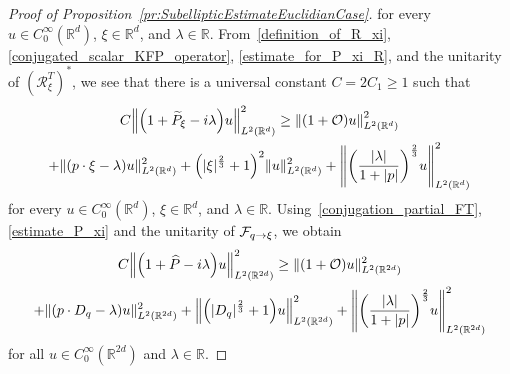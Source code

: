 \documentclass[AHL,Unicode,longabstracts]{cedram}
\newcommand{\R}{\mathbb{R}}
\newcommand{\clO}{\mathcal{O}}
\newcommand{\clR}{\mathcal{R}}
\newcommand{\clF}{\mathcal{F}}
\let\oldhat\hat
\renewcommand*{\hat}[1]{\mathchoice{\widehat{#1}}{\widehat{#1}}{\oldhat{#1}}{\oldhat{#1}}}
\let\originalleft\left
\let\originalright\right
\renewcommand{\left}{\mathopen{}\mathclose\bgroup\originalleft}
\renewcommand{\right}{\aftergroup\egroup\originalright}
\renewcommand*{\to}{\mathchoice{\longrightarrow}{\rightarrow}{\rightarrow}{\rightarrow}}
\begin{document}
\begin{proof}[{Proof of Proposition~\ref{pr:SubellipticEstimateEuclidianCase}}]
for every $u \in C^\infty_0(\R^d)$, $\xi \in \R^d$, and $\lambda \in \R$. From~\eqref{definition_of_R_xi}, \eqref{conjugated_scalar_KFP_operator}, \eqref{estimate_for_P_xi_R}, and the unitarity of $(\clR^T_\xi )^*$, we see that there is a universal constant $C=2C_1\geq 1$ such that
\begin{multline}\label{estimate_P_xi}
C\left\| \left(1+\widetilde{P}_{\xi}-i\lambda\right)u \right\|^{2}_{L^2(\R^d)} \geq \left\| (1+\clO)u\right\|^{2}_{L^2(\R^d)}\\
+ \| (p\cdot\xi -\lambda)u\|^{2}_{L^2(\R^d)}
+ \left(|\xi|^{\frac{2}{3}}+1\right)^{2}\|u\|^{2}_{L^2(\R^d)} +
\left\|
\left(
\frac{|\lambda|}{1+|p|}
\right)^{\frac{2}{3}} u
\right\|^{2}_{L^2(\R^d)}
\end{multline}
for every $u \in C^\infty_0(\R^d)$, $\xi \in \R^d$, and $\lambda \in \R$. Using~\eqref{conjugation_partial_FT}, \eqref{estimate_P_xi} and the unitarity of $\clF_{q\to\xi}$, we obtain
\begin{multline*}
C\left\|\left(1+\hat{P}-i\lambda\right)u\right\|^{2}_{L^2(\R^{2d})} \geq \| (1+\clO)u\|^{2}_{L^2(\R^{2d})}\\
+ \| (p\cdot D_{q}-\lambda)u\|^{2}_{L^2(\R^{2d})}
+ \left\|\left(|D_{q}|^{\frac{2}{3}}+1\right)u\right\|^{2}_{L^2(\R^{2d})} +
\left\|
\left(
\frac{|\lambda|}{1+|p|}
\right)^{\frac{2}{3}} u
\right\|^{2}_{L^2(\R^{2d})}
\end{multline*}
for all $u \in C^\infty_0(\R^{2d})$ and $\lambda \in \R$.


\end{proof}
\end{document}
